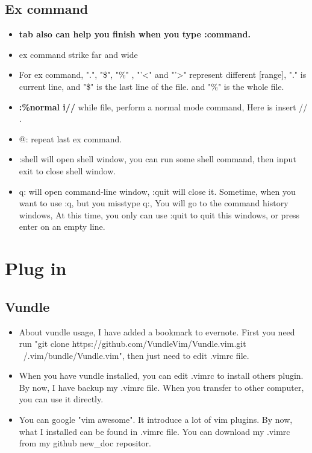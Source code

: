 \documentclass[a4paper,12pt,twoside]{book}
\begin{document}
\subsection{Ex command}
\begin{itemize}
		\item \textbf{tab also can help you finish when you type :command.}
				
		\item ex command strike far and wide
		
		\item  For ex command, ".", "\$", "\%" , "'<"  and "'>" represent different [range], "." is current line, and "\$" is the last line of the file. and "\%" is the whole file.
		
		\item \textbf{:\%normal i//} while file, perform a normal mode command, Here is insert // . 

		\item @: repeat last ex command.
		
		\item :shell will open shell window, you can run some shell command, then input exit to close shell window. 
		
		\item q: will open command-line window, :quit will close it. Sometime, when you want to use :q, but you misstype q:, You will go to the command history windows, At this time, you only can use :quit to quit this windows, or press enter on an empty line.
\end{itemize}

\section{Plug in}

\subsection{Vundle}
\begin{itemize}
		\item About vundle usage, I have added a bookmark to evernote. First you need run "git clone https://github.com/VundleVim/Vundle.vim.git ~/.vim/bundle/Vundle.vim", then just need to edit .vimrc file.  

		\item When you have vundle installed, you can edit .vimrc to install others plugin. By now, I have backup my .vimrc file. When you transfer to other computer, you can use it directly. 

		\item You can google "vim awesome". It introduce a lot of vim plugins. By now, what I installed can be found in .vimrc file. You can download my .vimrc from my github new\_doc repositor.
		\end{itemize}
\end{document}

